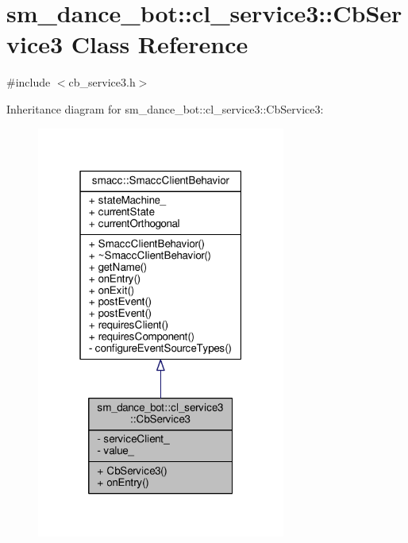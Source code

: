 \hypertarget{classsm__dance__bot_1_1cl__service3_1_1CbService3}{}\section{sm\+\_\+dance\+\_\+bot\+:\+:cl\+\_\+service3\+:\+:Cb\+Service3 Class Reference}
\label{classsm__dance__bot_1_1cl__service3_1_1CbService3}


{\ttfamily \#include $<$cb\+\_\+service3.\+h$>$}



Inheritance diagram for sm\+\_\+dance\+\_\+bot\+:\+:cl\+\_\+service3\+:\+:Cb\+Service3\+:\nopagebreak
\begin{figure}[H]
\begin{center}
\leavevmode
\includegraphics[width=232pt]{classsm__dance__bot_1_1cl__service3_1_1CbService3__inherit__graph}
\end{center}
\end{figure}


